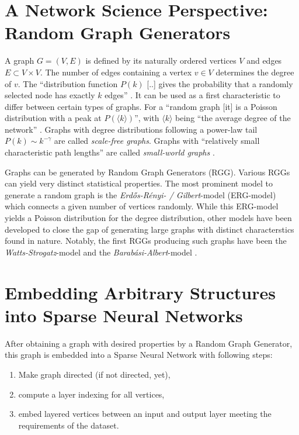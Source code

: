 \documentclass[runningheads]{llncs}
\begin{document}
\section{A Network Science Perspective: Random Graph Generators}
A graph $G = (V, E)$ is defined by its naturally ordered vertices $V$ and edges $E \subset V\times V$.
The number of edges containing a vertex $v\in V$ determines the degree of $v$.
The ``distribution function $P(k)$ [..] gives the probability that a randomly selected node has exactly $k$ edges'' \cite{albert2002statistical}.
It can be used as a first characteristic to differ between certain types of graphs.
For a ``random graph [it] is a Poisson distribution with a peak at $P(\langle k\rangle)$'', with $\langle k\rangle$ being ``the average degree of the network'' \cite{albert2002statistical}.
Graphs with degree distributions following a power-law tail $P(k) \sim k^{-\gamma}$ are called \textit{scale-free graphs}.
Graphs with ``relatively small characteristic path lengths'' are called \textit{small-world graphs} \cite{watts1998collective}.

Graphs can be generated by Random Graph Generators (RGG).
Various RGGs can yield very distinct statistical properties.
The most prominent model to generate a random graph is the \textit{Erdős-Rényi- / Gilbert}-model (ERG-model) which connects a given number of vertices randomly. While this ERG-model yields a Poisson distribution for the degree distribution, other models have been developed to close the gap of generating large graphs with distinct characterstics found in nature.
Notably, the first RGGs producing such graphs have been the \textit{Watts-Strogatz}-model \cite{watts1998collective} and the \textit{Barabási-Albert}-model \cite{albert2002statistical}.



\section{Embedding Arbitrary Structures into Sparse Neural Networks}
After obtaining a graph with desired properties by a Random Graph Generator, this graph is embedded into a Sparse Neural Network with following steps:
\begin{enumerate}
	\item Make graph directed (if not directed, yet),
	\item compute a layer indexing for all vertices,
	\item embed layered vertices between an input and output layer meeting the requirements of the dataset.
\end{enumerate}
\end{document}
